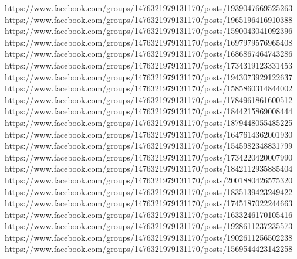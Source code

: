  
 
 
 
 



https://www.facebook.com/groups/1476321979131170/posts/1939047669525263
https://www.facebook.com/groups/1476321979131170/posts/1965196416910388
https://www.facebook.com/groups/1476321979131170/posts/1590043041092396
https://www.facebook.com/groups/1476321979131170/posts/1697979576965408
https://www.facebook.com/groups/1476321979131170/posts/1686867464743286
https://www.facebook.com/groups/1476321979131170/posts/1734319123331453
https://www.facebook.com/groups/1476321979131170/posts/1943073929122637
https://www.facebook.com/groups/1476321979131170/posts/1585860314844002
https://www.facebook.com/groups/1476321979131170/posts/1784961861600512
https://www.facebook.com/groups/1476321979131170/posts/1844215869008444
https://www.facebook.com/groups/1476321979131170/posts/1879448055485225
https://www.facebook.com/groups/1476321979131170/posts/1647614362001930
https://www.facebook.com/groups/1476321979131170/posts/1545982348831799
https://www.facebook.com/groups/1476321979131170/posts/1734220420007990
https://www.facebook.com/groups/1476321979131170/posts/1842112935885404
https://www.facebook.com/groups/1476321979131170/posts/2001880426575320
https://www.facebook.com/groups/1476321979131170/posts/1835139423249422
https://www.facebook.com/groups/1476321979131170/posts/1745187022244663
https://www.facebook.com/groups/1476321979131170/posts/1633246170105416
https://www.facebook.com/groups/1476321979131170/posts/1928611237235573
https://www.facebook.com/groups/1476321979131170/posts/1902611256502238
https://www.facebook.com/groups/1476321979131170/posts/1569544423142258
